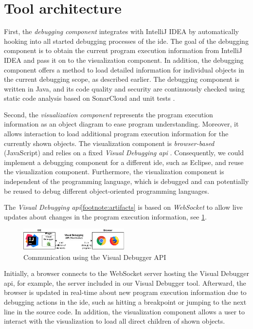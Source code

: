\documentclass[conference]{IEEEtran}
\newcommand{\intellij}{IntelliJ IDEA}
\begin{document}
\section{Tool architecture}  \label{sec:architecture}
First, the \textit{debugging component} integrates with \intellij{} by automatically hooking into all started debugging processes of the \gls*{ide}.
The goal of the debugging component is to obtain the current program execution information from \intellij{} and pass it on to the visualization component.
In addition, the debugging component offers a method to load detailed information for individual objects in the current debugging scope, as described earlier.
The debugging component is written in Java, and its code quality and security are continuously checked using static code analysis based on SonarCloud and unit tests \cite{ArtifactsICSME2022}.

Second, the \textit{visualization component} represents the program execution information as an object diagram to ease program understanding.
Moreover, it allows interaction to load additional program execution information for the currently shown objects.
The visualization component is \emph{browser-based} (JavaScript) and relies on a fixed \emph{Visual Debugging \gls*{api}} \cite{ArtifactsICSME2022}.
Consequently, we could implement a debugging component for a different \gls*{ide}, such as Eclipse, and reuse the visualization component.
Furthermore, the visualization component is independent of the programming language, which is debugged and can potentially be reused to debug different object-oriented programming languages.

The \textit{Visual Debugging \gls*{api}}\cref{footnote:artifacts} is based on \emph{WebSocket} to allow live updates about changes in the program execution information, see \cref{fig:api}.

\begin{figure}[h]
    \centering
    \includegraphics[width=0.488\textwidth]{images/VD-architecture.pdf}
    \caption{Communication using the Visual Debugger API}
    \label{fig:api}
\end{figure}

Initially, a browser connects to the WebSocket server hosting the Visual Debugger \gls*{api}, for example, the server included in our Visual Debugger tool.
Afterward, the browser is updated in real-time about new program execution information due to debugging actions in the \gls*{ide}, such as hitting a breakpoint or jumping to the next line in the source code.
In addition, the visualization component allows a user to interact with the visualization to load all direct children of shown objects.
\end{document}
